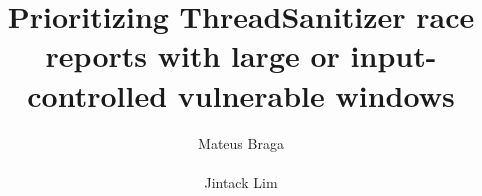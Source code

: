 \documentclass{acm_proc_article-sp}
\begin{document}
\title{Prioritizing ThreadSanitizer race reports with large or input-controlled vulnerable windows}
%
%
%
%
%

%
\author{
%
%
\alignauthor
Mateus Braga\\
	\\
\alignauthor
Jintack Lim\\
	\\
}

\end{document}
